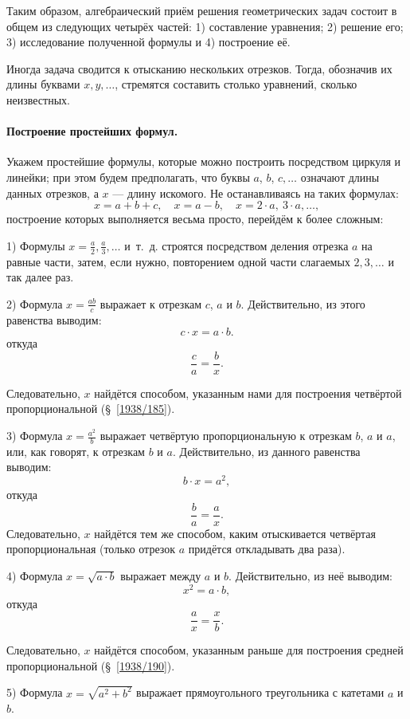 \documentclass[twoside]{book}
\begin{document}
Таким образом, алгебраический приём решения геометрических задач состоит в общем из следующих четырёх частей:
1) составление уравнения;
2) решение его;
3) исследование полученной формулы и 4) построение её.

Иногда задача сводится к отысканию нескольких отрезков.
Тогда, обозначив их длины буквами $x,y,\dots$, стремятся составить столько уравнений, сколько неизвестных.

\paragraph{Построение простейших формул.}\label{1938/211}
Укажем простейшие формулы, которые можно построить посредством циркуля и линейки;
при этом будем предполагать, что буквы $a$, $b$, $c,\dots$
означают длины данных отрезков, а $x$ — длину искомого.
Не останавливаясь на таких формулах:
\[x=a+b+c,
 \quad
 x=a-b,
 \quad
 x=2\cdot a,\ 3\cdot a,\dots,
\]
построение которых выполняется весьма просто, перейдём к более сложным:


1) Формулы $x=\frac a2, \frac a3,\dots$ и~т.~д. строятся посредством деления отрезка $a$ на равные части, затем, если нужно, повторением одной части слагаемых $2, 3,\dots$ и так далее раз.

2) Формула $x=\frac{ab}c$ выражает  к отрезкам $c$, $a$ и $b$.
Действительно, из этого равенства выводим:
\[c\cdot x=a\cdot b.\]
откуда
\[\frac ca=\frac bx.\]

Следовательно, $x$ найдётся способом, указанным нами для построения четвёртой пропорциональной (§~\ref{1938/185}).

3) Формула $x=\frac{a^2}b$ выражает четвёртую пропорциональную к отрезкам $b$, $a$ и $a$, или, как говорят,  к отрезкам $b$ и $a$.
Действительно, из данного равенства выводим:
\[b\cdot x=a^2,\]
откуда
\[\frac ba=\frac ax.\]
Следовательно, $x$ найдётся тем же способом, каким отыскивается четвёртая пропорциональная (только отрезок $a$ придётся откладывать два раза).

4) Формула $x=\sqrt{a\cdot b}$ выражает  между $a$ и $b$.
Действительно, из неё выводим:
\[x^2=a\cdot b,\]
откуда
\[\frac ax=\frac xb.\]

Следовательно, $x$ найдётся способом, указанным раньше для построения средней пропорциональной (§~\ref{1938/190}).

5) Формула $x=\sqrt{a^2+b^2}$ выражает  прямоугольного треугольника с катетами $a$ и $b$.
\end{document}
